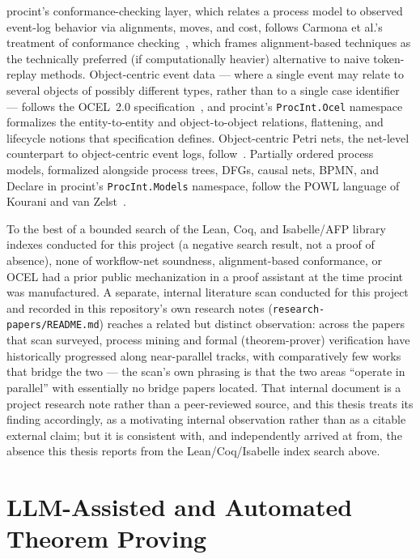 \textsf{procint}'s conformance-checking layer, which relates a process
model to observed event-log behavior via alignments, moves, and cost,
follows Carmona et al.'s treatment of conformance
checking~\cite{carmona2018}, which frames alignment-based techniques as
the technically preferred (if computationally heavier) alternative to
naive token-replay methods. Object-centric event data --- where a single
event may relate to several objects of possibly different types, rather
than to a single case identifier --- follows the OCEL~2.0
specification~\cite{ocel2}, and \textsf{procint}'s \texttt{ProcInt.Ocel}
namespace formalizes the entity-to-entity and object-to-object relations,
flattening, and lifecycle notions that specification defines.
Object-centric Petri nets, the net-level counterpart to object-centric
event logs, follow~\cite{ocpn2020}. Partially ordered process models,
formalized alongside process trees, DFGs, causal nets, BPMN, and Declare
in \textsf{procint}'s \texttt{ProcInt.Models} namespace, follow the POWL
language of Kourani and van Zelst~\cite{powl2023}.

To the best of a bounded search of the Lean, Coq, and Isabelle/AFP
library indexes conducted for this project (a negative search result,
not a proof of absence), none of workflow-net soundness, alignment-based
conformance, or OCEL had a prior public mechanization in a proof
assistant at the time \textsf{procint} was manufactured. A separate,
internal literature scan conducted for this project and recorded in this
repository's own research notes (\texttt{research-papers/README.md})
reaches a related but distinct observation: across the papers that scan
surveyed, process mining and formal (theorem-prover) verification have
historically progressed along near-parallel tracks, with comparatively
few works that bridge the two --- the scan's own phrasing is that the two
areas ``operate in parallel'' with essentially no bridge papers located.
That internal document is a project research note rather than a
peer-reviewed source, and this thesis treats its finding accordingly, as
a motivating internal observation rather than as a citable external
claim; but it is consistent with, and independently arrived at from, the
absence this thesis reports from the Lean/Coq/Isabelle index search
above.

\section{LLM-Assisted and Automated Theorem Proving}

